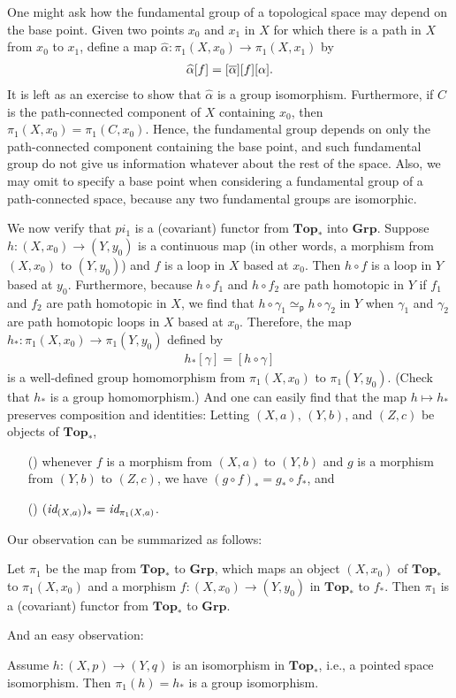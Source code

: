 One might ask how the fundamental group of a topological space may depend on the base point.
Given two points $x_0$ and $x_1$ in $X$ for which there is a path in $X$ from $x_0$ to $x_1$, define a map $\widehat{\alpha}: \pi_1(X, x_0)\rightarrow\pi_1(X, x_1)$ by
\begin{align*}
    \widehat{\alpha}[f]=[\overline{\alpha}][f][\alpha].
\end{align*}
\color{brown}It is left as an exercise to show that $\widehat{\alpha}$ is a group isomorphism. \color{black}
Furthermore, if $C$ is the path-connected component of $X$ containing $x_0$, then $\pi_1(X, x_0)=\pi_1(C, x_0)$.
Hence, the fundamental group depends on only the path-connected component containing the base point, and such fundamental group do not give us information whatever about the rest of the space.
Also, we may omit to specify a base point when considering a fundamental group of a path-connected space, because any two fundamental groups are isomorphic.

We now verify that $pi_1$ is a (covariant) functor from $\textbf{Top}_*$ into $\textbf{Grp}$.
Suppose $h: (X, x_0)\rightarrow (Y, y_0)$ is a continuous map (in other words, a morphism from $(X, x_0)$ to $(Y, y_0)$) and $f$ is a loop in $X$ based at $x_0$.
Then $h\circ f$ is a loop in $Y$ based at $y_0$.
Furthermore, because $h\circ f_1$ and $h\circ f_2$ are path homotopic in $Y$ if $f_1$ and $f_2$ are path homotopic in $X$, we find that $h\circ \gamma_1\simeq_\textsf{p} h\circ \gamma_2$ in $Y$ when $\gamma_1$ and $\gamma_2$ are path homotopic loops in $X$ based at $x_0$.
Therefore, the map $h_*: \pi_1(X, x_0)\rightarrow \pi_1(Y, y_0)$ defined by
\begin{align*}
    h_*[\gamma]=[h\circ\gamma]
\end{align*}
is a well-defined group homomorphism from $\pi_1(X, x_0)$ to $\pi_1(Y, y_0)$.
\color{brown}(Check that $h_*$ is a group homomorphism.) \color{black}
And one can easily find that the map $h\mapsto h_*$ preserves composition and identities:
Letting $(X, a),\, (Y, b)$, and $(Z, c)$ be objects of $\textbf{Top}_*$,
\begin{enumerate}
    \item[(\romannumeral 1)]
    {
        whenever $f$ is a morphism from $(X, a)$ to $(Y, b)$ and $g$ is a morphism from $(Y, b)$ to $(Z, c)$, we have $(g\circ f)_*=g_*\circ f_*$, and
    }
    \item[(\romannumeral 2)]
    {
        $(\textit{id}_{(X, a)})_*=\textit{id}_{\pi_1(X, a)}$.
    }
\end{enumerate}
Our observation can be summarized as follows:
\begin{thm}
    Let $\pi_1$ be the map from $\textbf{Top}_*$ to $\textbf{Grp}$, which maps an object $(X, x_0)$ of $\textbf{Top}_*$ to $\pi_1(X, x_0)$ and a morphism $f: (X, x_0)\rightarrow (Y, y_0)$ in $\textbf{Top}_*$ to $f_*$.
    Then $\pi_1$ is a (covariant) functor from $\textbf{Top}_*$ to $\textbf{Grp}$.
\end{thm}
And an easy observation:
\begin{obs}
    Assume $h: (X, p)\rightarrow (Y, q)$ is an isomorphism in $\textbf{Top}_*$, i.e., a pointed space isomorphism.
    Then $\pi_1(h)=h_*$ is a group isomorphism.
\end{obs}

